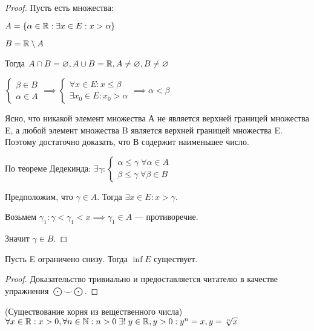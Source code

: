 \begin{proof}
    Пусть есть множества:
    
    $A = \{\alpha \in \mathbb{R}: \exists x \in E: x > \alpha\}$

    $B = \mathbb{R} \setminus A$

    Тогда $A \cap B = \varnothing, A \cup B = \mathbb{R}, A \neq \varnothing, B \neq \varnothing$

    $\begin{cases}
        \beta \in B \\
        \alpha \in A
    \end{cases} \implies \begin{cases}
        \forall x \in E: x \leq \beta\\
        \exists x_0 \in E: x_0 > \alpha
    \end{cases} \implies \alpha < \beta$

    Ясно, что никакой элемент множества А не является верхней границей множества E, а любой элемент множества B является верхней границей множества E. Поэтому достаточно доказать, что В содержит наименьшее число.
    
    По теореме Дедекинда: $\exists \gamma: \begin{cases}
        \alpha \leq \gamma \; \forall \alpha \in A\\
        \beta \leq \gamma \; \forall \beta \in B
    \end{cases}$

    Предположим, что $\gamma \in A$. Тогда $\exists x \in E: x > \gamma$.
    
    Возьмем $\gamma_1: \gamma < \gamma_1 < x \implies \gamma_1 \in A$ --- противоречие. 
    
    Значит $\gamma \in B$.
\end{proof}

\begin{theorem}
    Пусть E ограничено снизу. Тогда $\inf E$ существует.
\end{theorem}

\begin{proof}
    Доказательство тривиально и предоставляется читателю в качестве упражнения $\bigodot \smile \bigodot$.
\end{proof}

\begin{theorem} (Существование корня из вещественного числа)
    $\forall x \in \mathbb{R}: x > 0, \forall n \in \mathbb{N}: n > 0 \; \exists! \; y \in \mathbb{R}, y > 0: y^n = x, y = \sqrt[n]{x}$
\end{theorem}

